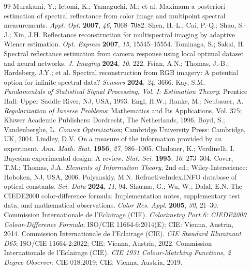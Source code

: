 \documentclass[11pt]{article}
\begin{document}
\begin{thebibliography}{99}
Murakami, Y.; Ietomi, K.; Yamaguchi, M.; et al. Maximum a posteriori estimation of spectral reflectance from color image and multipoint spectral measurements. \textit{Appl. Opt.} \textbf{2007}, \textit{46}, 7068--7082.
Shen, H.-L.; Cai, P.-Q.; Shao, S.-J.; Xin, J.H. Reflectance reconstruction for multispectral imaging by adaptive Wiener estimation. \textit{Opt. Express} \textbf{2007}, \textit{15}, 15545--15554.
Tominaga, S.; Sakai, H. Spectral reflectance estimation from camera response using local optimal dataset and neural networks. \textit{J. Imaging} \textbf{2024}, \textit{10}, 222.
Fsian, A.N.; Thomas, J.-B.; Hardeberg, J.Y.; et al. Spectral reconstruction from RGB imagery: A potential option for infinite spectral data? \textit{Sensors} \textbf{2024}, \textit{24}, 3666.
Kay, S.M. \textit{Fundamentals of Statistical Signal Processing, Vol. I: Estimation Theory}; Prentice Hall: Upper Saddle River, NJ, USA, 1993.
Engl, H.W.; Hanke, M.; Neubauer, A. \textit{Regularization of Inverse Problems}; Mathematics and Its Applications, Vol. 375; Kluwer Academic Publishers: Dordrecht, The Netherlands, 1996.
Boyd, S.; Vandenberghe, L. \textit{Convex Optimization}; Cambridge University Press: Cambridge, UK, 2004.
Lindley, D.V. On a measure of the information provided by an experiment. \textit{Ann. Math. Stat.} \textbf{1956}, \textit{27}, 986--1005.
Chaloner, K.; Verdinelli, I. Bayesian experimental design: A review. \textit{Stat. Sci.} \textbf{1995}, \textit{10}, 273--304.
Cover, T.M.; Thomas, J.A. \textit{Elements of Information Theory}, 2nd ed.; Wiley-Interscience: Hoboken, NJ, USA, 2006.
Polyanskiy, M.N. RefractiveIndex.INFO database of optical constants. \textit{Sci. Data} \textbf{2024}, \textit{11}, 94.
Sharma, G.; Wu, W.; Dalal, E.N. The CIEDE2000 color-difference formula: Implementation notes, supplementary test data, and mathematical observations. \textit{Color Res. Appl.} \textbf{2005}, \textit{30}, 21--30.
Commission Internationale de l'Eclairage (CIE). \textit{Colorimetry Part 6: CIEDE2000 Colour-Difference Formula}; ISO/CIE 11664-6:2014(E); CIE: Vienna, Austria, 2014.
Commission Internationale de l'Eclairage (CIE). \textit{CIE Standard Illuminant D65}; ISO/CIE 11664-2:2022; CIE: Vienna, Austria, 2022.
Commission Internationale de l'Eclairage (CIE). \textit{CIE 1931 Colour-Matching Functions, 2 Degree Observer}; CIE 018:2019; CIE: Vienna, Austria, 2019.

\end{thebibliography}
\end{document}
